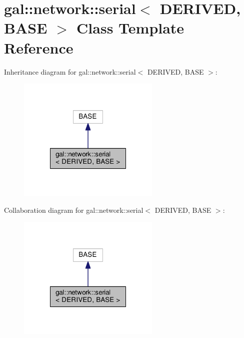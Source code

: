 \hypertarget{classgal_1_1network_1_1serial}{\section{gal\-:\-:network\-:\-:serial$<$ D\-E\-R\-I\-V\-E\-D, B\-A\-S\-E $>$ Class Template Reference}
\label{classgal_1_1network_1_1serial}
}


Inheritance diagram for gal\-:\-:network\-:\-:serial$<$ D\-E\-R\-I\-V\-E\-D, B\-A\-S\-E $>$\-:
\nopagebreak
\begin{figure}[H]
\begin{center}
\leavevmode
\includegraphics[width=192pt]{classgal_1_1network_1_1serial__inherit__graph}
\end{center}
\end{figure}


Collaboration diagram for gal\-:\-:network\-:\-:serial$<$ D\-E\-R\-I\-V\-E\-D, B\-A\-S\-E $>$\-:
\nopagebreak
\begin{figure}[H]
\begin{center}
\leavevmode
\includegraphics[width=192pt]{classgal_1_1network_1_1serial__coll__graph}
\end{center}
\end{figure}
